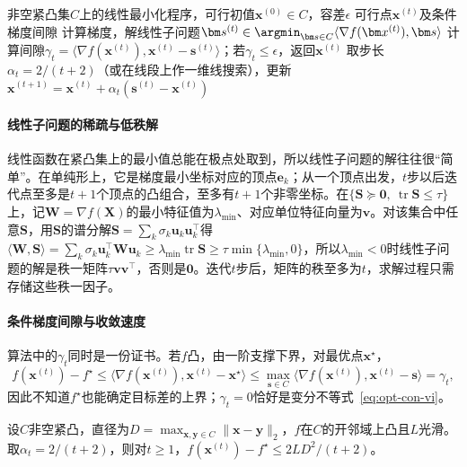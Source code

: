 \begin{algorithm}[条件梯度法]
\label{alg:opt-con-frank-wolfe}
\begin{algorithmic}[1]
\Require 非空紧凸集$C$上的线性最小化程序，可行初值$\bm x^{(0)}\in C$，容差$\epsilon$
\Ensure 可行点$\bm x^{(t)}$及条件梯度间隙
  \State 计算梯度，解线性子问题$\bm s^{(t)}\in\argmin_{\bm s\in C}\langle\nabla f(\bm x^{(t)}),\bm s\rangle$
  \State 计算间隙$\gamma_t=\langle\nabla f(\bm x^{(t)}),\bm x^{(t)}-\bm s^{(t)}\rangle$；若$\gamma_t\leq\epsilon$，返回$\bm x^{(t)}$
  \State 取步长$\alpha_t=2/(t+2)$（或在线段上作一维线搜索），更新$\bm x^{(t+1)}=\bm x^{(t)}+\alpha_t(\bm s^{(t)}-\bm x^{(t)})$
\EndFor
\end{algorithmic}
\end{algorithm}

\paragraph{线性子问题的稀疏与低秩解}
线性函数在紧凸集上的最小值总能在极点处取到，所以线性子问题的解往往很“简单”。在单纯形上，它是梯度最小坐标对应的顶点$\bm e_k$；从一个顶点出发，$t$步以后迭代点至多是$t+1$个顶点的凸组合，至多有$t+1$个非零坐标。在$\{\bm S\succeq\bm0,\ \operatorname{tr}\bm S\leq\tau\}$上，记$\bm W=\nabla f(\bm X)$的最小特征值为$\lambda_{\min}$、对应单位特征向量为$\bm v$。对该集合中任意$\bm S$，用$\bm S$的谱分解$\bm S=\sum_k\sigma_k\bm u_k\bm u_k^\top$得$\langle\bm W,\bm S\rangle=\sum_k\sigma_k\bm u_k^\top\bm W\bm u_k\geq\lambda_{\min}\operatorname{tr}\bm S\geq\tau\min\{\lambda_{\min},0\}$，所以$\lambda_{\min}<0$时线性子问题的解是秩一矩阵$\tau\bm v\bm v^\top$，否则是$\bm0$。迭代$t$步后，矩阵的秩至多为$t$，求解过程只需存储这些秩一因子。

\paragraph{条件梯度间隙与收敛速度}
算法中的$\gamma_t$同时是一份证书。若$f$凸，由一阶支撑下界，对最优点$\bm x^\star$，
\[
  f(\bm x^{(t)})-f^\star\leq\langle\nabla f(\bm x^{(t)}),\bm x^{(t)}-\bm x^\star\rangle\leq\max_{\bm s\in C}\langle\nabla f(\bm x^{(t)}),\bm x^{(t)}-\bm s\rangle=\gamma_t,
\]
因此不知道$f^\star$也能确定目标差的上界；$\gamma_t=0$恰好是变分不等式~\eqref{eq:opt-con-vi}。

\begin{theorem}[条件梯度法的收敛速度]
\label{thm:opt-con-frank-wolfe}
设$C$非空紧凸，直径为$D=\max_{\bm x,\bm y\in C}\lVert\bm x-\bm y\rVert_2$，$f$在$C$的开邻域上凸且$L$光滑。取$\alpha_t=2/(t+2)$，则对$t\geq1$，$f(\bm x^{(t)})-f^\star\leq2LD^2/(t+2)$。
\end{theorem}

